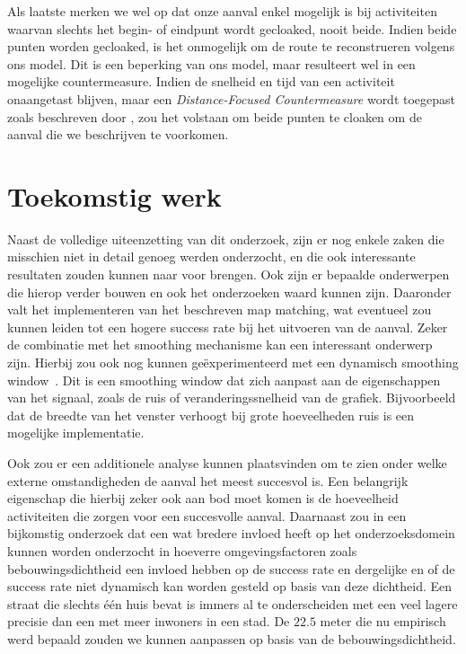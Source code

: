 Als laatste merken we wel op dat onze aanval enkel mogelijk is bij activiteiten
waarvan slechts het begin- of eindpunt wordt gecloaked, nooit beide. Indien
beide punten worden gecloaked, is het onmogelijk om de route te reconstrueren
volgens ons model. Dit is een beperking van ons model, maar resulteert wel in
een mogelijke countermeasure. Indien de snelheid en tijd van een activiteit
onaangetast blijven, maar een \textit{Distance-Focused Countermeasure} wordt
toegepast zoals beschreven door \citeauthor{Dhondt}, zou het volstaan om beide
punten te cloaken om de aanval die we beschrijven te voorkomen.

\section{Toekomstig werk}
Naast de volledige uiteenzetting van dit onderzoek, zijn er nog enkele zaken
die misschien niet in detail genoeg werden onderzocht, en die ook interessante
resultaten zouden kunnen naar voor brengen. Ook zijn er bepaalde onderwerpen
die hierop verder bouwen en ook het onderzoeken waard kunnen zijn. Daaronder
valt het implementeren van het beschreven map matching, wat eventueel zou
kunnen leiden tot een hogere success rate bij het uitvoeren van de aanval.
Zeker de combinatie met het smoothing mechanisme kan een interessant onderwerp
zijn. Hierbij zou ook nog kunnen geëxperimenteerd met een dynamisch smoothing
window~\cite{shmoothing}. Dit is een smoothing window dat zich aanpast aan de
eigenschappen van het signaal, zoals de ruis of veranderingssnelheid van de
grafiek. Bijvoorbeeld dat de breedte van het venster verhoogt bij grote
hoeveelheden ruis is een mogelijke implementatie.

Ook zou er een additionele analyse kunnen plaatsvinden om te zien onder welke
externe omstandigheden de aanval het meest succesvol is. Een belangrijk
eigenschap die hierbij zeker ook aan bod moet komen is de hoeveelheid
activiteiten die zorgen voor een succesvolle aanval. Daarnaast zou in een
bijkomstig onderzoek dat een wat bredere invloed heeft op het onderzoeksdomein
kunnen worden onderzocht in hoeverre omgevingsfactoren zoals
bebouwingsdichtheid een invloed hebben op de success rate en dergelijke en of
de success rate niet dynamisch kan worden gesteld op basis van deze dichtheid.
Een straat die slechts één huis bevat is immers al te onderscheiden met een
veel lagere precisie dan een met meer inwoners in een stad. De $22.5$ meter die
nu empirisch werd bepaald zouden we kunnen aanpassen op basis van de
bebouwingsdichtheid.

